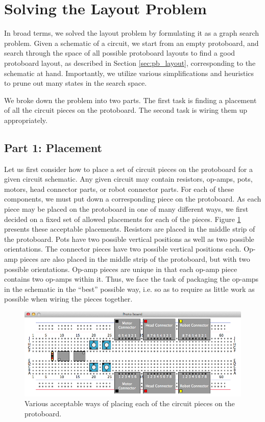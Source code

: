 \section{Solving the Layout Problem}

In broad terms, we solved the layout problem by formulating it as a graph search
problem. Given a schematic of a circuit, we start from an empty
protoboard, and search through the space of all possible protoboard layouts to
find a good protoboard layout, as described in Section
\ref{sec:pb_layout}, corresponding to the schematic at hand. Importantly, we
utilize various simplifications and heuristics to prune out many states in the
search space.

We broke down the problem into two parts. The first task is finding a placement
of all the circuit pieces on the protoboard. The second task is wiring them up
appropriately.

\subsection{Part 1: Placement}
\label{sec:placement}

Let us first consider how to place a set of circuit pieces on the protoboard for
a given circuit schematic. Any given circuit may contain resistors, op-amps,
pots, motors, head connector parts, or robot connector parts. For each of these
components, we must put down a corresponding piece on the protoboard. As each
piece may be placed on the protoboard in one of many different ways, we first
decided on a fixed set of allowed placements for each of the pieces. Figure
\ref{fig:piece_placement} presents these acceptable placements.
Resistors are placed in the middle strip of the protoboard.
Pots have two possible vertical positions as well as two possible orientations.
The connector pieces have two possible vertical positions each.
Op-amp pieces are also placed in the middle strip of the protoboard, but with
two possible orientations. Op-amp pieces are unique in that each op-amp piece
contains two op-amps within it. Thus, we face the task of packaging the op-amps
in the schematic in the ``best'' possible way, i.e. so as to require as little
work as possible when wiring the pieces together.

\begin{figure}
\begin{center}
\includegraphics[width=\linewidth]{Images/piece_placement_options.png}
\caption[Acceptable circuit piece placements]{Various acceptable ways of
placing each of the circuit pieces on the protoboard.}
\label{fig:piece_placement}
\end{center}
\end{figure}

